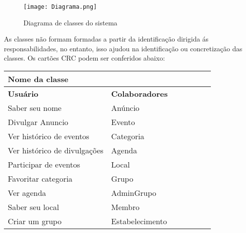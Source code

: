 \documentclass{article}
\begin{document}
				\begin{center}
				\begin{figure}[h]
				\texttt{[image: Diagrama.png]}
				\caption{Diagrama de classes do sistema}
				\end{figure}
				\end{center}
	As classes não formam formadas a partir da identificação dirigida ás responsabilidades, no entanto, isso ajudou na identificação ou concretização das classes. Os cartões CRC podem ser conferidos abaixo:
	
			\begin{center}
			   	 \begin{tabular}{|p{0.5\linewidth}|p{0.5\linewidth}|}
				\hline
			 	\multicolumn{2}{|p{\textwidth}|}{
					{\large \textbf{Nome da classe}}
				}  \\
				\hline
			
				\textbf{Usuário} & \textbf{Colaboradores} \\ 
			  	Saber seu nome &  Anúncio \\
			  	Divulgar  Anuncio & Evento \\
			  	Ver histórico de eventos & Categoria \\
			  	Ver histórico de divulgações & Agenda \\
			  	Participar de eventos & Local \\
			  	Favoritar categoria & Grupo \\
			  	Ver agenda &  AdminGrupo \\
			  	Saber seu local &  Membro \\ 
			  	Criar um grupo &  Estabelecimento \\
				\hline			  
			  
			    \hline
			   	\end{tabular} 
			    \end{center}
			
			
			\begin{easylist}[articletoc]
			\end{easylist}
			
\end{document}
